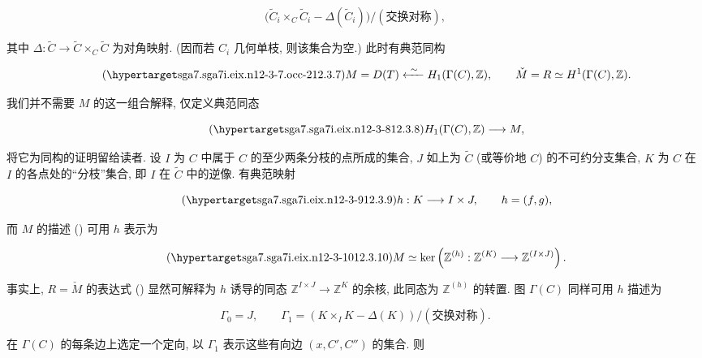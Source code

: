 \begin{equation*}
 \bigl(\widetilde C_i\times_C\widetilde C_i-
       \Delta(\widetilde C_i)\bigr)/(\text{交换对称}),
\end{equation*}

\noindent
其中 $\Delta:\widetilde C\to\widetilde C\times_C\widetilde C$ 为对角映射. (因而若 $C_i$ 几何单枝, 则该集合为空.) 此时有典范同构

\begin{equation}\tag{\SGARefTarget{sga7.sga7i.eix.n12-3-7.occ-2}{12.3.7}}
 M=D(T)\xleftarrow{\ \sim\ }H_1(\Gamma(C),\mathbb Z),
 \qquad
 \check M=R\simeq H^1(\Gamma(C),\mathbb Z).
\end{equation}

我们并不需要 $M$ 的这一组合解释, 仅定义典范同态

\begin{equation}\tag{\SGARefTarget{sga7.sga7i.eix.n12-3-8}{12.3.8}}
 H_1(\Gamma(C),\mathbb Z)\longrightarrow M,
\end{equation}

\noindent
将它为同构的证明留给读者. 设 $I$ 为 $C$ 中属于 $C$ 的至少两条分枝的点所成的集合, $J$ 如上为 $\widetilde C$ (或等价地 $C$) 的不可约分支集合, $K$ 为 $C$ 在 $I$ 的各点处的“分枝”集合, 即 $I$ 在 $\widetilde C$ 中的逆像. 有典范映射

\begin{equation}\tag{\SGARefTarget{sga7.sga7i.eix.n12-3-9}{12.3.9}}
 h:K\longrightarrow I\times J,
 \qquad h=(f,g),
\end{equation}

\noindent
而 $M$ 的描述 () 可用 $h$ 表示为

\begin{equation}\tag{\SGARefTarget{sga7.sga7i.eix.n12-3-10}{12.3.10}}
 M\simeq\ker\left(
  \mathbb Z^{(h)}:\mathbb Z^{(K)}\longrightarrow
  \mathbb Z^{(I\times J)}\right).
\end{equation}

事实上, $R=\check M$ 的表达式 () 显然可解释为 $h$ 诱导的同态 $\mathbb Z^{I\times J}\to\mathbb Z^K$ 的余核, 此同态为 $\mathbb Z^{(h)}$ 的转置. 图 $\Gamma(C)$ 同样可用 $h$ 描述为

\begin{equation*}
 \Gamma_0=J,
 \qquad
 \Gamma_1=(K\times_I K-\Delta(K))/(\text{交换对称}).
\end{equation*}

在 $\Gamma(C)$ 的每条边上选定一个定向, 以 $\Gamma_1$ 表示这些有向边 $(x,C',C'')$ 的集合. 则

